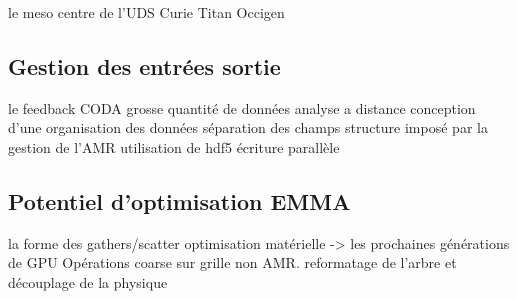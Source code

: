 le meso centre de l'UDS
Curie
Titan
Occigen

\subsection{Gestion des entrées sortie}

le feedback CODA
grosse quantité de données
analyse a distance
conception d'une organisation des données
séparation des champs
structure imposé par la gestion de l'AMR
utilisation de hdf5
écriture parallèle

\subsection{Potentiel d'optimisation EMMA}

la forme des gathers/scatter
optimisation matérielle -> les prochaines générations de GPU
Opérations coarse sur grille non AMR.
reformatage de l'arbre et découplage de la physique
